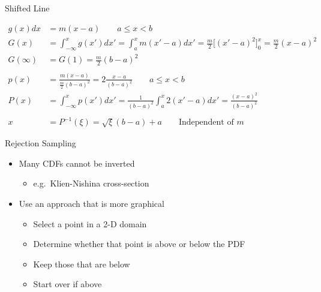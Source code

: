\documentclass[xcolor=x11names,compress, handouts]{beamer}
\renewcommand{\(}{\begin{columns}}
\renewcommand{\)}{\end{columns}}
\newcommand{\<}[1]{\begin{column}{#1}}
\renewcommand{\>}{\end{column}}
\begin{document}
\begin{frame}{Shifted Line}

\[
  \begin{aligned}
  g(x) dx &= m(x - a) \qquad a \leq x < b\\
  G(x) &= \int_{-\infty}^x g(x')dx' = \int_a^x m(x'-a) dx' = \frac{m}{2}\bigl[(x'-a)^2 \bigr]_0^x = \frac{m}{2} (x-a)^2\\
    G(\infty) &= G(1) = \frac{m}{2}(b-a)^2\\
    \\p(x) &= \frac{m(x-a)}{\frac{m}{2}(b-a)^2} = 2 \frac{x-a}{(b-a)^2}\qquad a \leq x < b\\
    P(x) &= \int_{-\infty}^x p(x')dx' = \frac{1}{(b-a)^2}\int_a^x 2(x'-a) dx' = \frac{(x-a)^2}{(b-a)^2}\\
    &\\
    x &= P^{-1}(\xi) = \sqrt{\xi}(b-a) + a \qquad\text{Independent of }m
  \end{aligned}
\]    
    
\end{frame}


\begin{frame}{Rejection Sampling}

    \begin{itemize}
    \item Many CDFs cannot be inverted
      \begin{itemize}
      \item e.g.\ Klien-Nishina cross-section
      \end{itemize}
    \vspace*{1 em}
    \pause
    \item Use an approach that is more graphical
      \begin{itemize}
      \item Select a point in a 2-D domain
      \item Determine whether that point is above or below the PDF
      \item Keep those that are below
      \item Start over if above
      \end{itemize}
    \end{itemize}

\end{frame}
\end{document}
